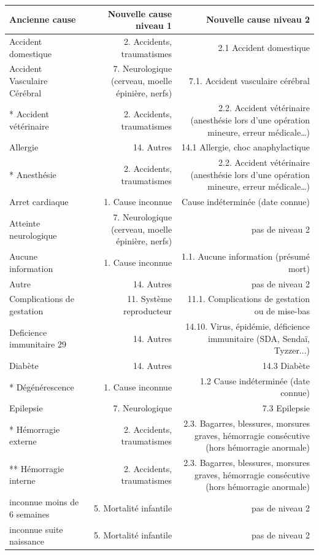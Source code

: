 \documentclass[a4paper,10pt]{article}
\begin{document}
\noindent\begin{tabularx}{\textwidth}{|l|R|R|}\hline
\textbf{Ancienne cause} & \textbf{Nouvelle cause niveau 1} & \textbf{Nouvelle cause niveau 2}\\\hline
Accident domestique & 2. Accidents, traumatismes & 2.1 Accident domestique \\\hline
Accident Vasculaire Cérébral & 7. Neurologique (cerveau, moelle épinière, nerfs) & 7.1. Accident vasculaire cérébral\\\hline
* Accident vétérinaire & 2. Accidents, traumatismes & 2.2. Accident vétérinaire (anesthésie lors d’une opération mineure, erreur médicale…)\\\hline
Allergie & 14. Autres & 14.1 Allergie, choc anaphylactique\\\hline
* Anesthésie & 2. Accidents, traumatismes & 2.2. Accident vétérinaire (anesthésie lors d’une opération mineure, erreur médicale…)\\\hline
Arret cardiaque & 1. Cause inconnue & Cause indéterminée (date connue)\\\hline
Atteinte neurologique & 7. Neurologique (cerveau, moelle épinière, nerfs) & pas de niveau 2\\\hline
Aucune information & 1. Cause inconnue & 1.1. Aucune information (présumé mort)\\\hline
Autre & 14. Autres & pas de niveau 2\\\hline
Complications de gestation & 11. Système reproducteur & 11.1. Complications de gestation ou de mise-bas\\\hline
Deficience immunitaire 29 & 14. Autres & 14.10. Virus, épidémie, déficience immunitaire (SDA, Sendaï, Tyzzer...)\\\hline
Diabète & 14. Autres & 14.3 Diabète\\\hline
* Dégénérescence & 1. Cause inconnue & 1.2 Cause indéterminée (date connue)\\\hline
Epilepsie & 7. Neurologique & 7.3 Epilepsie\\\hline
* Hémorragie externe & 2. Accidents, traumatismes & 2.3. Bagarres, blessures, morsures graves, hémorragie consécutive (hors hémorragie anormale)\\\hline
** Hémorragie interne & 2. Accidents, traumatismes & 2.3. Bagarres, blessures, morsures graves, hémorragie consécutive (hors hémorragie anormale)\\\hline
inconnue moins de 6 semaines & 5. Mortalité infantile & pas de niveau 2\\\hline
inconnue suite naissance & 5. Mortalité infantile & pas de niveau 2\\\hline

\end{tabularx}
\end{document}
